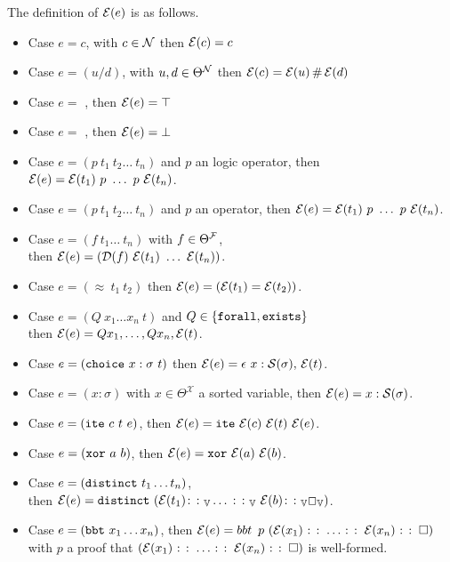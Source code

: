 \begin{definition}
The definition of $\E{e}$ is as follows.
\begin{itemize}
\setlength{\parskip}{0pt}
\item Case $e = c$, with $c \in \cal{N}$ then $\E{c} = c$
\item Case $e = (u \slash d)$, with $u,d \in \Theta^\cal{N}$ then $\E{c} = \E{u} \,\#\, \E{d}$
\item Case $e =$ , then $\E{e} = \top$
\item Case $e =$ , then $\E{e} = \bot$
\item Case $e = (p~t_1~t_2\dots~t_n)$ and $p$ an logic operator, then $\E{e} = \E{t_1}~p~\dots~p~\E{t_n}$.
\item Case $e = (p~t_1~t_2\dots~t_n)$ and $p$ an operator, then $\E{e} = \E{t_1}~p~\dots~p~\E{t_n}$.
\item Case $e = (f~t_1\dots~t_n)$ with $f \in \Theta^\cal{F}$,\\
  then $\E{e} = (\mathcal{D}(f)~\E{t_1}~\dots~\E{t_n})$.
\item Case $e = (\approx~t_1~t_2)$ then $\E{e} = (\E{t_1} = \E{t_2})$.
\item Case $e = (Q~x_1  \dots x_n ~t)$ and $Q\in \{\kw{forall}, \kw{exists}\}$\\
  then $\E{e} = Q x_1, \dots, Q x_n, \E{t}$. 
\item Case $e = (\kw{choice}~x : \sigma ~t)$ then $\E{e} = \epsilon~x: \cal{S}(\sigma),\, \E{t}$.
\item Case $e = (x: \sigma )$ with $x \in \Theta^\mathcal{X}$ a sorted variable, then $\E{e} = x: \cal{S}(\sigma)$.
\item Case $e = (\kw{ite}~c~t~e)$, then $\E{e} = \kw{ite}~\E{c}~\E{t}~\E{e}$.
\item Case $e = (\kw{xor}~a~b)$, then $\E{e} = \kw{xor}~\E{a}~\E{b}$.
\item Case $e = (\kw{distinct}~t_1 \dots t_n)$,\\
  then $\E{e} = \kw{distinct}~(\E{t_1} \colon\colon_\bb{V} \dots\, \colon\colon_\bb{V} ~\E{b} \colon\colon_\bb{V} \Box_\bb{V})$.
\item Case $e = (\kw{bbt}~x_1 \dots x_n)$, then $\E{e} = \mathop{bbt}~p~(\E{x_1} \mathbin{\colon\colon} \dots \mathbin{\colon\colon} \E{x_n} \mathbin{\colon\colon} \square)$
with $p$ a proof that \((\E{x_1} \mathbin{\colon\colon} \dots \mathbin{\colon\colon} \E{x_n} \mathbin{\colon\colon} \square)\) is well-formed.
\end{itemize}
\end{definition}